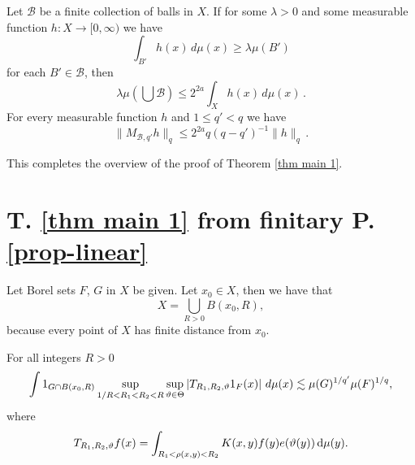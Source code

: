 \begin{prop}\label{prop hlm}
   Let $\mathcal{B}$ be a finite collection of balls in $X$.
If for some $\lambda>0$ and some measurable function $h:X\to [0,\infty)$ we have
\begin{equation}\label{eq ball assumption}
\int_{B'} h(x)\, d\mu(x)\ge \lambda \mu(B')
\end{equation}
   for each $B'\in \mathcal{B}$,
   then
   \begin{equation}\label{eq besico}
\lambda \mu(\bigcup \mathcal{B}) \le 2^{2a}\int_X h(x)\, d\mu(x)\, .
       \end{equation}
For every measurable function $h$ 
and $1\le q'<q$ we have 
\begin{equation}\label{eq hlm}
    \|M_{\mathcal{B},q'} h\|_q\le 2^{2a}q(q-q')^{-1} \|h\|_q\, .
\end{equation}


\end{prop}


This completes the overview of the proof of Theorem
\ref{thm main 1}.


\chapter{T. \ref{thm main 1} from finitary P.
\ref{prop-linear}}
\label{thmfromproplinear}


Let Borel sets $F$, $G$ in $X$ be given.
Let $x_0\in X$, then we have that
\begin{equation}
    X=\bigcup_{R>0}B(x_0,R),
\end{equation} because every point of $X$
has finite distance from $x_0$.
\begin{lemma}\label{lemmarcut}
For all integers $R>0$
    \begin{equation} \label{Rcut}
    \int 1_{G\cap B(x_0,R)}
\sup_{1/R<R_1<R_2<R}\sup_{\vartheta\in\Theta}
\left| T_{R_1,R_2,\vartheta} 1_{F}(x) \right|\, d\mu(x)
\lesssim \mu(G)^{1/q'} \mu(F)^{1/q},
\end{equation}
where
\begin{equation}\label{TRR}
    T_{R_1,R_2,\vartheta} f(x)=
\int_{R_1 <  \rho(x,y) < R_2}  K(x,y) f(y) e(\vartheta(y)) \, \mathrm{d}\mu(y) .
\end{equation}
\end{lemma}

